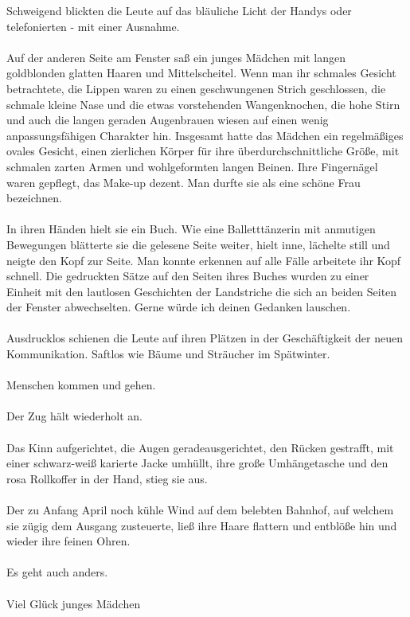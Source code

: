 Schweigend blickten die Leute auf das bläuliche Licht der Handys oder telefonierten - mit einer Ausnahme.\\\\
Auf der anderen Seite am Fenster saß ein junges Mädchen mit langen goldblonden glatten Haaren und Mittelscheitel. Wenn man ihr schmales Gesicht betrachtete, die Lippen waren zu einen geschwungenen Strich geschlossen, die schmale kleine Nase und die etwas vorstehenden Wangenknochen, die hohe Stirn und auch die langen geraden Augenbrauen wiesen auf einen wenig anpassungsfähigen Charakter hin. Insgesamt hatte das Mädchen ein regelmäßiges ovales Gesicht, einen zierlichen Körper für ihre überdurchschnittliche Größe, mit schmalen zarten Armen und wohlgeformten langen Beinen. Ihre Fingernägel waren gepflegt, das Make-up dezent. Man durfte sie als eine schöne Frau bezeichnen. \\\\
In ihren Händen hielt sie ein Buch. Wie eine Balletttänzerin mit anmutigen Bewegungen blätterte sie die gelesene Seite weiter, hielt inne, lächelte still und neigte den Kopf zur Seite. Man konnte erkennen auf alle Fälle arbeitete ihr Kopf schnell. Die gedruckten Sätze auf den Seiten ihres Buches wurden zu einer Einheit mit den lautlosen Geschichten der Landstriche die sich an beiden Seiten der Fenster abwechselten. Gerne würde ich deinen Gedanken lauschen. \\\\
Ausdrucklos schienen die Leute auf ihren Plätzen in der Geschäftigkeit der neuen Kommunikation. Saftlos wie Bäume und Sträucher im Spätwinter. \\\\
Menschen kommen und gehen.\\\\
Der Zug hält wiederholt an.\\\\
Das Kinn aufgerichtet, die Augen geradeausgerichtet, den Rücken gestrafft, mit einer schwarz-weiß karierte Jacke umhüllt, ihre große Umhängetasche und den rosa Rollkoffer in der Hand, stieg sie aus.\\\\
Der zu Anfang April noch kühle Wind auf dem belebten Bahnhof, auf welchem sie zügig dem Ausgang zusteuerte, ließ ihre Haare flattern und entblöße hin und wieder ihre feinen Ohren. \\\\

Es geht auch anders.
\\\\
Viel Glück junges Mädchen 

